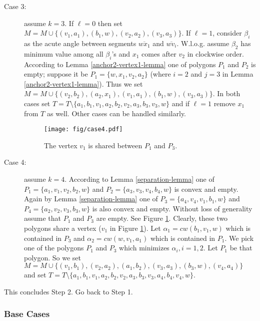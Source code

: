 \documentclass[11pt,a4paper]{article}
\newcommand{\cw}{cw}
\begin{document}
\begin{description}
  \item[Case 3:] assume $k=3$. If $\ell = 0$ then set $M=M\cup\{(v_1,a_1), (b_1,w), (v_2,a_2), (v_3,a_3)\}$. If $\ell=1$, consider $\beta_i$ as the acute angle between segments $\overline{wx_1}$ and $\overline{wv_i}$. W.l.o.g. assume $\beta_2$ has minimum value among all $\beta_i$'s and $x_1$ comes after $v_2$ in clockwise order. According to Lemma \ref{anchor2-vertex1-lemma} one of polygons $P_1$ and $P_2$ is empty; suppose it be $P_1=\{w,x_1,v_2,a_2\}$ (where $i=2$ and $j=3$ in Lemma \ref{anchor2-vertex1-lemma}). Thus we set $M=M\cup\{(v_2, b_2), (a_2,x_1),\allowbreak (v_1,a_1), (b_1,w),\allowbreak  (v_3,a_3)\}$. In both cases set $T = T\setminus\{a_1,b_1,\allowbreak v_1, a_2,\allowbreak b_2,v_2, \allowbreak a_3,b_3,v_3, w\}$ and if $\ell = 1$ remove $x_1$ from $T$ as well. Other cases can be handled similarly.


\begin{figure}[ht]
  \centering
    \texttt{[image: fig/case4.pdf]}
  \caption{The vertex $v_1$ is shared between $P_1$ and $P_3$.}
\label{case4-fig}
\end{figure}

  \item[Case 4:] assume $k=4$. According to Lemma \ref{separation-lemma} one of $P_1=\{a_1,v_1,v_2,b_2,w\}$ and $P_2=\{a_3,v_3,v_4,b_4,w\}$ is convex and empty. Again by Lemma \ref{separation-lemma} one of $P_3=\{a_4,v_4,v_1,b_1,w\}$ and $P_4=\{a_2,v_2,v_3,b_3,w\}$ is also convex and empty. Without loss of generality assume that $P_1$ and $P_3$ are empty. See Figure \ref{case4-fig}. Clearly, these two polygons share a vertex ($v_1$ in Figure \ref{case4-fig}). Let $\alpha_1=\cw(b_1,v_1,w)$ which is contained in $P_3$ and $\alpha_2=\cw(w,v_1,a_1)$ which is contained in $P_1$. We pick one of the polygons $P_1$ and $P_3$ which minimizes $\alpha_i, i=1,2$. Let $P_1$ be that polygon. So we set $M = M \cup  \allowbreak \{(v_1,b_1) , \allowbreak (v_2,a_2) ,\allowbreak  (a_1,b_2),\allowbreak (v_3, a_3),\allowbreak  (b_3,w),\allowbreak  (v_4,a_4)\}$ and set $T = T\setminus\{a_1,b_1,\allowbreak v_1,\allowbreak  a_2,\allowbreak b_2,v_2, \allowbreak  a_3, b_3,v_3,\allowbreak a_4,\allowbreak b_4\allowbreak,v_4,w \}$. 
 \end{description}

This concludes Step 2. Go back to Step 1.

\subsubsection{Base Cases}
\label{base-cases}
\end{document}
